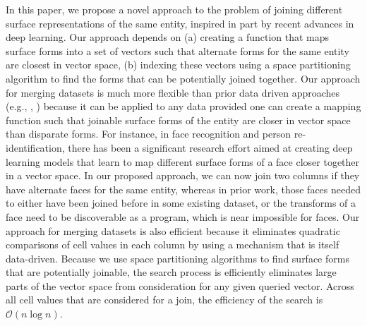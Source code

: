 In this paper, we propose a novel approach to the problem of joining different surface representations of the same entity, inspired in part by recent advances in deep learning.  Our approach depends on (a) creating a function that maps surface forms into a set of vectors such that alternate forms for the same entity are closest in vector space, (b) indexing these vectors using a space partitioning algorithm to find the forms that can be potentially joined together.  Our approach for merging datasets is much more flexible than prior data driven approaches (e.g., \cite{He:2015:SJS:2824032.2824036}, \cite{auto-join-joining-tables-leveraging-transformations}) because it can be applied to any data provided one can create a mapping function such that joinable surface forms of the entity are closer in vector space than disparate forms.  For instance, in face recognition and person re-identification, there has been a significant research effort aimed at creating deep learning models that learn to map different surface forms of a face closer together in a vector space.  In our proposed approach, we can now join two columns if they have alternate faces for the same entity, whereas in prior work, those faces needed to either have been joined before in some existing dataset, or the transforms of a face need to be discoverable as a program, which is near impossible for faces.  Our approach for merging datasets is also efficient because it eliminates quadratic comparisons of cell values in each column by using a mechanism that is itself data-driven.  Because we use space partitioning algorithms to find surface forms that are potentially joinable, the search process is efficiently eliminates large parts of the vector space from consideration for any given queried vector.  Across all cell values that are considered for a join, the efficiency of the search is $\mathcal{O}(n\log{}n)$.

